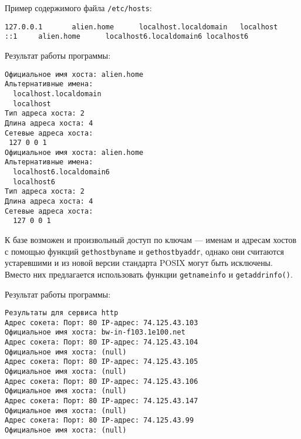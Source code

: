 

Пример содержимого файла {\tt /etc/hosts}:
\begin{verbatim}
127.0.0.1       alien.home      localhost.localdomain   localhost
::1     alien.home      localhost6.localdomain6 localhost6
\end{verbatim}


Результат работы программы:
\begin{verbatim}
Официальное имя хоста: alien.home
Альтернативные имена:
  localhost.localdomain
  localhost
Тип адреса хоста: 2
Длина адреса хоста: 4
Сетевые адреса хоста:
 127 0 0 1
Официальное имя хоста: alien.home
Альтернативные имена:
  localhost6.localdomain6
  localhost6
Тип адреса хоста: 2
Длина адреса хоста: 4
Сетевые адреса хоста:
  127 0 0 1
\end{verbatim}

К базе возможен и произвольный доступ по ключам --- именам и адресам хостов с помощью функций {\tt gethostbyname} и {\tt gethostbyaddr}, однако они считаются устаревшими и из новой версии стандарта POSIX могут быть исключены. Вместо них предлагается использовать функции {\tt getnameinfo} и {\tt getaddrinfo()}.


Результат работы программы:
\begin{verbatim}
Результаты для сервиса http
Адрес сокета: Порт: 80 IP-адрес: 74.125.43.103
Официальное имя хоста: bw-in-f103.1e100.net
Адрес сокета: Порт: 80 IP-адрес: 74.125.43.104
Официальное имя хоста: (null)
Адрес сокета: Порт: 80 IP-адрес: 74.125.43.105
Официальное имя хоста: (null)
Адрес сокета: Порт: 80 IP-адрес: 74.125.43.106
Официальное имя хоста: (null)
Адрес сокета: Порт: 80 IP-адрес: 74.125.43.147
Официальное имя хоста: (null)
Адрес сокета: Порт: 80 IP-адрес: 74.125.43.99
Официальное имя хоста: (null)
\end{verbatim}


